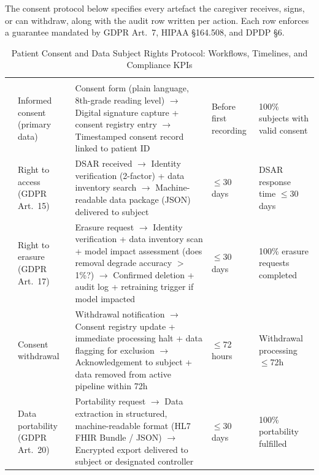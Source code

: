 \noindent The consent protocol below specifies every artefact the caregiver receives, signs, or can withdraw, along with the audit row written per action. Each row enforces a guarantee mandated by GDPR Art.~7, HIPAA \S164.508, and DPDP \S6.
{\tablestripes\tablefontsize
\begin{xltabular}{\textwidth}{@{} p{0.4cm} p{1.8cm} L p{1.8cm} p{1.8cm} @{}}
\caption[Patient Consent and Data Subject Rights Protocol]{Patient Consent and Data Subject Rights Protocol: Workflows, Timelines, and Compliance KPIs}\label{tab:consent_protocol} \\
\toprule
\thead{\#} &  &  &  &  \\
\midrule
\endfirsthead
\toprule
\thead{\#} &  &  &  &  \\
\midrule
\endhead
\bottomrule
{} & Informed consent (primary data) & Consent form (plain language, 8th-grade reading level) $\to$ Digital signature capture + consent registry entry $\to$ Timestamped consent record linked to patient ID & Before first recording & 100\% subjects with valid consent \\
 & Right to access (GDPR Art.~15) & DSAR received $\to$ Identity verification (2-factor) + data inventory search $\to$ Machine-readable data package (JSON) delivered to subject & $\leq$30 days & DSAR response time $\leq$30 days \\
 & Right to erasure (GDPR Art.~17) & Erasure request $\to$ Identity verification + data inventory scan + model impact assessment (does removal degrade accuracy $>$1\%?) $\to$ Confirmed deletion + audit log + retraining trigger if model impacted & $\leq$30 days & 100\% erasure requests completed \\
 & Consent withdrawal & Withdrawal notification $\to$ Consent registry update + immediate processing halt + data flagging for exclusion $\to$ Acknowledgement to subject + data removed from active pipeline within 72h & $\leq$72 hours & Withdrawal processing $\leq$72h \\
 & Data portability (GDPR Art.~20) & Portability request $\to$ Data extraction in structured, machine-readable format (HL7 FHIR Bundle / JSON) $\to$ Encrypted export delivered to subject or designated controller & $\leq$30 days & 100\% portability fulfilled \\

\end{xltabular}}
